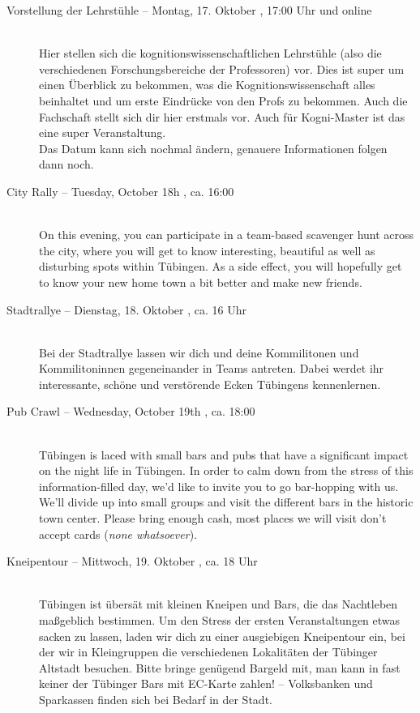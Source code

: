 \begin{description}
\ifkogwiss
	\item[Vorstellung der Lehrstühle -- Montag, 17. Oktober \YEAR, 17:00 Uhr und online]\ \\
		Hier stellen sich die kognitionswissenschaftlichen Lehrstühle (also die verschiedenen Forschungsbereiche der Professoren) vor. Dies ist super um einen Überblick zu bekommen, was die Kognitionswissenschaft alles beinhaltet und um erste Eindrücke von den Profs zu bekommen. Auch die Fachschaft stellt sich dir hier erstmals vor. %
		Auch für Kogni-Master ist das eine super Veranstaltung. \\
		Das Datum kann sich nochmal ändern, genauere Informationen folgen dann noch.
\fi

\ifml
	\item[City Rally -- Tuesday, October 18h \YEAR, ca. 16:00]~\\
	On this evening, you can participate in a team-based scavenger hunt across the city,
	where you will get to know interesting, beautiful as well as disturbing spots within Tübingen.
	As a side effect, you will hopefully get to know your new home town a bit better and make new friends.
\else
	\item[Stadtrallye -- Dienstag, 18. Oktober \YEAR, ca. 16 Uhr]~\\
	Bei der Stadtrallye lassen wir dich und deine Kommilitonen und Kommilitoninnen gegeneinander in Teams antreten.
	Dabei werdet ihr interessante, schöne und verstörende Ecken Tübingens kennenlernen.
\fi


\ifml
\item[Pub Crawl -- Wednesday, October 19th \YEAR, ca. 18:00]~\\
Tübingen is laced with small bars and pubs that have a significant impact on the night life in Tübingen.
In order to calm down from the stress of this information-filled day, we'd like to invite you to go bar-hopping with us.
We'll divide up into small groups and visit the different bars in the historic town center.
Please bring enough cash, most places we will visit don't accept cards (\emph{none whatsoever}).

\else
\item[Kneipentour -- Mittwoch, 19. Oktober \YEAR, ca. 18 Uhr]~\\
Tübingen ist übersät mit kleinen Kneipen und Bars, die das Nachtleben maßgeblich bestimmen.
Um den Stress der ersten Veranstaltungen etwas sacken zu lassen, laden wir dich zu einer ausgiebigen Kneipentour ein,
bei der wir in Kleingruppen die verschiedenen Lokalitäten der Tübinger Altstadt besuchen.
Bitte bringe genügend Bargeld mit, man kann in fast keiner der Tübinger Bars mit EC-Karte zahlen! -- Volksbanken und Sparkassen finden sich bei Bedarf in der Stadt.
\fi


\end{description}
